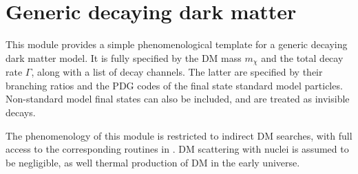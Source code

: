 \chapter{Generic decaying dark matter}
\label{ch:decay}

This module provides a simple phenomenological template 
for a generic decaying dark matter model. It is fully specified by
the DM mass $m_\chi$ and the total decay rate $\Gamma$, 
along with a list of decay channels. The latter are specified by their
branching ratios and the PDG codes of the final state standard 
model particles. Non-standard model final states can
also be included, and are treated as invisible decays.

The phenomenology of this module is restricted to indirect 
DM searches, with full access to the corresponding routines 
in . DM scattering with nuclei is assumed to be 
negligible, as well thermal production of DM in the early universe.



